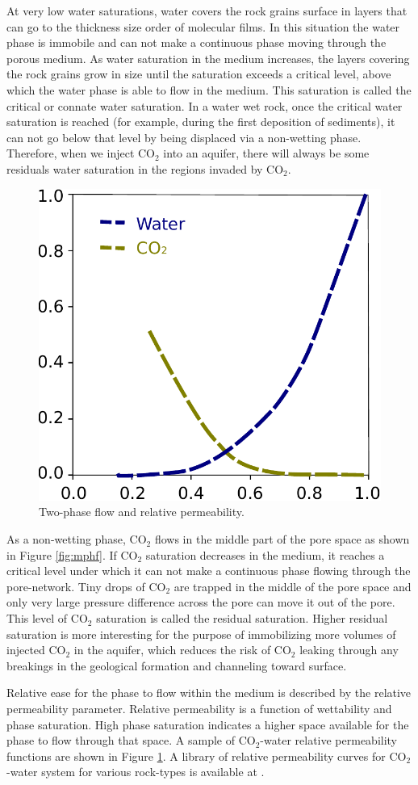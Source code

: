 At very low water saturations, water covers the rock grains surface in layers
that can go to the thickness size order of molecular films. In this
situation the water phase is
immobile and can not make a continuous phase moving through the porous medium.
As water saturation in the medium increases, the layers covering the rock grains
grow in size until the saturation exceeds a critical level, above which the
water phase is able to flow in the medium. This saturation is called the
critical or connate water saturation. In a water wet rock, once the
critical water saturation
is reached (for example, during the first deposition of sediments), it can not
go below that level by being displaced via a non-wetting phase. Therefore, when
we inject $\mbox{CO}_2$ into an aquifer, there will always be some residuals
water saturation in the regions invaded by $\mbox{CO}_2$.

\begin{figure} 
  \centering{}
  \includegraphics[width= 0.45 \linewidth]{./figurer/Kr}
  \caption{Two-phase flow and relative permeability.}
  \label{fig:kr}
\end{figure}

As a non-wetting phase, $\mbox{CO}_2$ flows in the middle part of the pore space
as shown in Figure \ref{fig:mphf}. If $\mbox{CO}_2$ saturation decreases in the
medium, it reaches a critical level under which it can not make a continuous
phase flowing through the pore-network. Tiny drops of $\mbox{CO}_2$ are trapped
in the middle of the pore space and only very large pressure difference across
the pore can move it out of the pore. This level of $\mbox{CO}_2$ saturation  is
called the residual saturation. Higher residual saturation is more interesting
for the purpose of immobilizing more volumes of injected $\mbox{CO}_2$ in the
aquifer, which reduces the risk of $\mbox{CO}_2$ leaking through any breakings
in the geological formation and channeling toward surface.

Relative ease for the phase to flow within the medium is described by
the relative
permeability parameter. Relative permeability is a function of wettability and
phase saturation. High phase saturation indicates a higher space available for
the phase to flow through that space. A sample of $\mbox{CO}_2$-water relative
permeability functions are shown in Figure \ref{fig:kr}. A library of relative
permeability curves for $\mbox{CO}_2$-water system for various rock-types is
available at \cite{krLib}.

